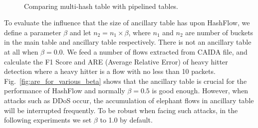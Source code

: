 \begin{figure}[ht!]
    \centering
    \mbox{
    }
    \caption{Comparing multi-hash table with pipelined tables.}
    \label{fig:performance_comparison_hierarchical_hashtable}
\end{figure}

To evaluate the influence that the size of ancillary table has upon HashFlow, we define a parameter $\beta$ and let $n_2=n_1\times\beta$, where $n_1$ and $n_2$ are number of buckets in the main table and ancillary table respectively. There is not an ancillary table at all when $\beta=0.0$. We feed a number of flows extracted from CAIDA file, and calculate the F1 Score and ARE (Average Relative Error) of heavy hitter detection where a heavy hitter is a flow with no less than 10 packets. Fig.~\ref{fig:are_for_various_beta} shows that the ancillary table is crucial for the performance of HashFlow and normally $\beta=0.5$ is good enough. However, when attacks such as DDoS occur, the accumulation of elephant flows in ancillary table will be interrupted frequently. To be robust when facing such attacks, in the following experiments we  set $\beta$ to 1.0 by default.

